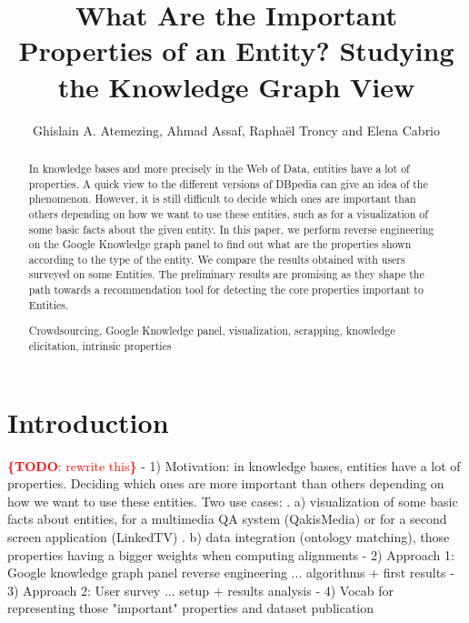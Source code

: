 \documentclass[runningheads,a4paper]{llncs}
\newcommand{\keywords}[1]{\par\addvspace\baselineskip
\noindent\keywordname\enspace\ignorespaces#1}
\newcommand{\todo}[1]{\noindent\textcolor{red}{{\bf \{TODO}: #1{\bf \}}}}
\begin{document}
\title{What Are the Important Properties of an Entity? Studying the Knowledge Graph View}

\author{Ghislain A. Atemezing, Ahmad Assaf, Rapha\"{e}l Troncy and Elena Cabrio }



\maketitle


\begin{abstract}
In knowledge bases and more precisely in the Web of Data, entities have a lot of properties. A quick view to the different versions of DBpedia can give an idea of the phenomenon. However, it is still difficult to decide which ones are important than others depending on how we want to use these entities, such as for a visualization of some basic facts about the given entity. In this paper, we perform reverse engineering on the Google Knowledge graph panel to find out what are the properties shown according to the type of the entity. We compare the results obtained with users surveyed on some Entities. The preliminary results are promising as they shape the path towards a recommendation tool for detecting the core properties important to Entities.
\keywords{Crowdsourcing, Google Knowledge panel, visualization, scrapping, knowledge elicitation, intrinsic properties}
\end{abstract}


\section{Introduction}
\label{sec:introduction}
\todo{rewrite this}
- 1) Motivation: in knowledge bases, entities have a lot of properties. Deciding which ones are more important than others depending on how we want to use these entities. Two use cases:
   . a) visualization of some basic facts about entities, for a multimedia QA system (QakisMedia) or for a second screen application (LinkedTV)
   . b) data integration (ontology matching), those properties having a bigger weights when computing alignments
 - 2) Approach 1: Google knowledge graph panel reverse engineering ... algorithms + first results
 - 3) Approach 2: User survey ... setup + results analysis
 - 4) Vocab for representing those "important" properties and dataset publication
\end{document}
